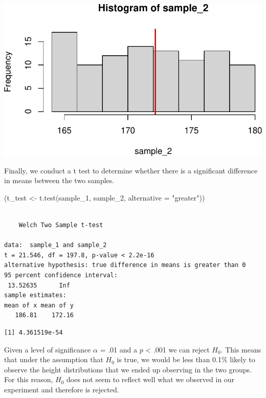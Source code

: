 \documentclass[
  letterpaper,
  DIV=11,
  numbers=noendperiod]{scrartcl}
\newenvironment{Shaded}{\begin{snugshade}}{\end{snugshade}}
\newcommand{\AttributeTok}[1]{\textcolor[rgb]{0.40,0.45,0.13}{#1}}
\newcommand{\FunctionTok}[1]{\textcolor[rgb]{0.28,0.35,0.67}{#1}}
\newcommand{\NormalTok}[1]{\textcolor[rgb]{0.00,0.23,0.31}{#1}}
\newcommand{\OtherTok}[1]{\textcolor[rgb]{0.00,0.23,0.31}{#1}}
\newcommand{\SpecialCharTok}[1]{\textcolor[rgb]{0.37,0.37,0.37}{#1}}
\newcommand{\StringTok}[1]{\textcolor[rgb]{0.13,0.47,0.30}{#1}}
\begin{document}
\begin{center}
\includegraphics{stats_review_files/figure-pdf/unnamed-chunk-21-1.pdf}
\end{center}

Finally, we conduct a t test to determine whether there is a significant
difference in means between the two samples.

\begin{Shaded}
\begin{Highlighting}[]
\NormalTok{(t\_test }\OtherTok{\textless{}{-}} \FunctionTok{t.test}\NormalTok{(sample\_1, sample\_2, }\AttributeTok{alternative =} \StringTok{"greater"}\NormalTok{))}
\end{Highlighting}
\end{Shaded}

\begin{verbatim}

    Welch Two Sample t-test

data:  sample_1 and sample_2
t = 21.546, df = 197.8, p-value < 2.2e-16
alternative hypothesis: true difference in means is greater than 0
95 percent confidence interval:
 13.52635      Inf
sample estimates:
mean of x mean of y 
   186.81    172.16 
\end{verbatim}

\begin{Shaded}
\end{Shaded}

\begin{verbatim}
[1] 4.361519e-54
\end{verbatim}

Given a level of significance \(\alpha\) = .01 and a \(p\) \textless{}
.001 we can reject \(H_0\). This means that under the assumption that
\(H_0\) is true, we would be less than 0.1\% likely to observe the
height distributions that we ended up observing in the two groups. For
this reason, \(H_0\) does not seem to reflect well what we observed in
our experiment and therefore is rejected.
\end{document}
